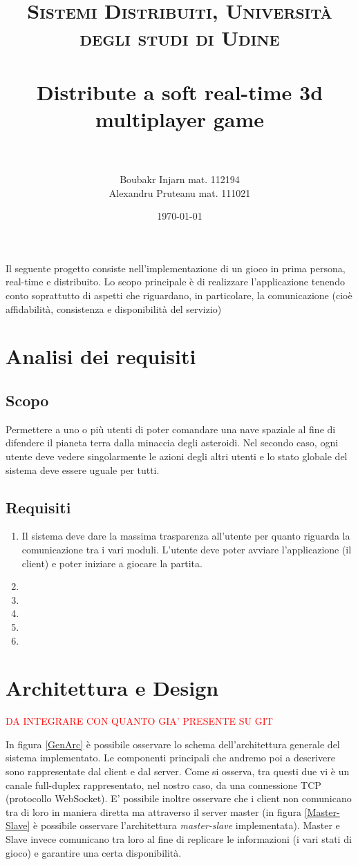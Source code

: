 \documentclass[paper=a4, fontsize=11pt]{scrartcl} %
\title{	
\normalfont \normalsize 
\textsc{Sistemi Distribuiti, Università degli studi di Udine} \\ [25pt] %
\horrule{0.5pt} \\[0.4cm] %
\huge Distribute a soft real-time 3d multiplayer game\\%
\horrule{2pt} \\[0.5cm] %
}
\author{Boubakr Injarn mat. 112194\\Alexandru Pruteanu mat. 111021} %
\date{\normalsize\today} %
\numberwithin{equation}{section} %
\numberwithin{figure}{section} %
\numberwithin{table}{section} %
\begin{document}
\maketitle %
\newpage
\tableofcontents
\listoffigures
\newpage
\textbf{\abstractname}

Il seguente progetto consiste nell'implementazione di un gioco in prima persona,
real-time e distribuito. Lo scopo principale è di realizzare l'applicazione tenendo
conto soprattutto di aspetti che riguardano, in particolare, la comunicazione
(cioè affidabilità, consistenza e disponibilità del servizio)

\section{Analisi dei requisiti}
\subsection{Scopo}
Permettere a uno o più utenti di poter comandare una nave spaziale al fine di difendere il pianeta terra dalla minaccia degli asteroidi. Nel secondo caso, ogni utente deve vedere singolarmente le azioni degli altri utenti e lo stato globale del sistema deve essere uguale per tutti.
\subsection{Requisiti}
\begin{enumerate}
\item Il sistema deve dare la massima trasparenza all'utente per quanto riguarda la comunicazione tra i vari moduli. L'utente deve poter avviare l'applicazione (il client) e poter iniziare a giocare la partita.
\item 
\item
\item
\item
\item
\end{enumerate}

\section{Architettura e Design}
\textcolor{red}{DA INTEGRARE CON QUANTO GIA' PRESENTE SU GIT}

In figura \ref{GenArc} è possibile osservare lo schema dell'architettura generale del sistema implementato. Le componenti principali che andremo poi a descrivere sono rappresentate dal client e dal server. Come si osserva, tra questi due vi è un canale full-duplex rappresentato, nel nostro caso, da una connessione TCP (protocollo WebSocket). E' possibile inoltre osservare che i client non comunicano tra di loro in maniera diretta ma attraverso il server master (in figura \ref{Master-Slave} è possibile osservare l'architettura \textit{master-slave} implementata). Master e Slave invece comunicano tra loro al fine di replicare le informazioni (i vari stati di gioco) e garantire una certa disponibilità.
\end{document}
